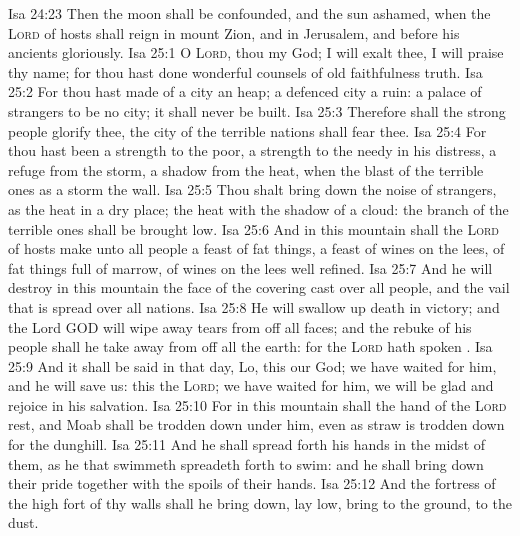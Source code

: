 \vs Isa 24:23 Then the moon shall be confounded, and the sun ashamed, when the \textsc{Lord} of hosts shall reign in mount Zion, and in Jerusalem, and before his ancients gloriously.
\vs Isa 25:1 O \textsc{Lord}, thou  my God; I will exalt thee, I will praise thy name; for thou hast done wonderful  counsels of old  faithfulness  truth.
\vs Isa 25:2 For thou hast made of a city an heap;  a defenced city a ruin: a palace of strangers to be no city; it shall never be built.
\vs Isa 25:3 Therefore shall the strong people glorify thee, the city of the terrible nations shall fear thee.
\vs Isa 25:4 For thou hast been a strength to the poor, a strength to the needy in his distress, a refuge from the storm, a shadow from the heat, when the blast of the terrible ones  as a storm  the wall.
\vs Isa 25:5 Thou shalt bring down the noise of strangers, as the heat in a dry place;  the heat with the shadow of a cloud: the branch of the terrible ones shall be brought low.
\vs Isa 25:6 And in this mountain shall the \textsc{Lord} of hosts make unto all people a feast of fat things, a feast of wines on the lees, of fat things full of marrow, of wines on the lees well refined.
\vs Isa 25:7 And he will destroy in this mountain the face of the covering cast over all people, and the vail that is spread over all nations.
\vs Isa 25:8 He will swallow up death in victory; and the Lord GOD will wipe away tears from off all faces; and the rebuke of his people shall he take away from off all the earth: for the \textsc{Lord} hath spoken .
\vs Isa 25:9 And it shall be said in that day, Lo, this  our God; we have waited for him, and he will save us: this  the \textsc{Lord}; we have waited for him, we will be glad and rejoice in his salvation.
\vs Isa 25:10 For in this mountain shall the hand of the \textsc{Lord} rest, and Moab shall be trodden down under him, even as straw is trodden down for the dunghill.
\vs Isa 25:11 And he shall spread forth his hands in the midst of them, as he that swimmeth spreadeth forth  to swim: and he shall bring down their pride together with the spoils of their hands.
\vs Isa 25:12 And the fortress of the high fort of thy walls shall he bring down, lay low,  bring to the ground,  to the dust.
